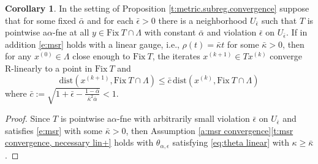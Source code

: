 \documentclass[12pt]{article}
\theoremstyle{definition}
\newtheorem{corollary}{Corollary}
\newcommand{\Ebb}{\mathbb{E}}
\newcommand{\dist}{\mathrm{dist}}
\newcommand{\Fix}{\mathrm{Fix}\ }
\begin{document}
\begin{corollary}\label{t:msr convergence lin}
In the setting of Proposition \ref{t:metric.subreg.convergence} suppose that
for some fixed $\bar\alpha$ and for each $\bar\epsilon>0$
there is a neighborhood  $U_{\bar\epsilon}$ such that $T$ is pointwise
a$\alpha$-fne at all $y\in\Fix T\cap \Lambda$ with constant $\bar\alpha$ and
violation $\bar\epsilon$ on $U_{\bar\epsilon}$.   If in addition
\eqref{e:msr} holds with a linear gauge, i.e., $\rho(t)=\bar\kappa t$ for
some $\bar\kappa>0$, then for any $x^{(0)}\in \Lambda$ close enough to $\Fix T$,
the iterates $x^{(k+1)}\in Tx^{(k)}$ converge R-linearly to a point in $\Fix T$ and
\begin{equation}
    \dist(x^{(k+1)},\Fix T\cap \Lambda)\leq \bar c\, \dist(x^{(k)},\Fix T\cap \Lambda)
\end{equation}
where
$\bar c:=\sqrt{1+\bar\epsilon-\tfrac{1-\bar\alpha}{\bar\kappa^2\bar\alpha}}<1$.
\end{corollary}
\begin{proof}
 Since $T$ is pointwise a$\alpha$-fne with arbitrarily small violation $\bar\epsilon$ on
 $U_{\bar\epsilon}$ and satisfies \eqref{e:msr} with some $\bar\kappa>0$, then Assumption
 \ref{a:msr convergence}\eqref{t:msr convergence, necessary lin+} holds with
 $\theta_{\alpha, \epsilon}$ satisfying \eqref{eq:theta linear} with $\kappa\geq\bar\kappa$.
\end{proof}
\end{document}

